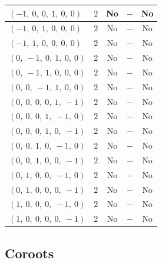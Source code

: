 \documentclass[11pt]{article}
\theoremstyle{definition}
\begin{document}
\begin{tabular}{|l|c|c|c|c|}
    \hline
    $\left( -1, \  0, \  0, \  1, \  0, \  0\right)$ & $2$ & No & $-$ & No \\
    \hline
    $\left( -1, \  0, \  1, \  0, \  0, \  0\right)$ & $2$ & No & $-$ & No \\
    \hline
    $\left( -1, \  1, \  0, \  0, \  0, \  0\right)$ & $2$ & No & $-$ & No \\
    \hline
    $\left( 0, \  -1, \  0, \  1, \  0, \  0\right)$ & $2$ & No & $-$ & No \\
    \hline
    $\left( 0, \  -1, \  1, \  0, \  0, \  0\right)$ & $2$ & No & $-$ & No \\
    \hline
    $\left( 0, \  0, \  -1, \  1, \  0, \  0\right)$ & $2$ & No & $-$ & No \\
    \hline
    $\left( 0, \  0, \  0, \  0, \  1, \  -1\right)$ & $2$ & No & $-$ & No \\
    \hline
    $\left( 0, \  0, \  0, \  1, \  -1, \  0\right)$ & $2$ & No & $-$ & No \\
    \hline
    $\left( 0, \  0, \  0, \  1, \  0, \  -1\right)$ & $2$ & No & $-$ & No \\
    \hline
    $\left( 0, \  0, \  1, \  0, \  -1, \  0\right)$ & $2$ & No & $-$ & No \\
    \hline
    $\left( 0, \  0, \  1, \  0, \  0, \  -1\right)$ & $2$ & No & $-$ & No \\
    \hline
    $\left( 0, \  1, \  0, \  0, \  -1, \  0\right)$ & $2$ & No & $-$ & No \\
    \hline
    $\left( 0, \  1, \  0, \  0, \  0, \  -1\right)$ & $2$ & No & $-$ & No \\
    \hline
    $\left( 1, \  0, \  0, \  0, \  -1, \  0\right)$ & $2$ & No & $-$ & No \\
    \hline
    $\left( 1, \  0, \  0, \  0, \  0, \  -1\right)$ & $2$ & No & $-$ & No \\
    \hline
\end{tabular}


\subsection{Coroots}
\end{document}
